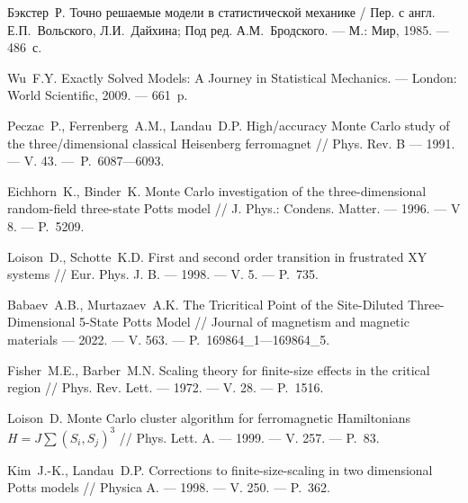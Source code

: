 \begin{thebibliography}{11}
Бэкстер~Р. 
Точно решаемые модели в статистической механике / Пер. с англ. Е.П.~Вольского, Л.И.~Дайхина; Под ред. А.М.~Бродского. 
--- М.: Мир, 1985. 
--- 486~с.





Wu~F.Y. 
Exactly Solved Models: A Journey in Statistical Mechanics. 
--- London: World Scientific, 2009. 
--- 661~p.





\foreignlanguage{english}{%
Peczac~P., Ferrenberg~A.M., Landau~D.P. 
High\-/accuracy Monte Carlo study of the three\-/dimensional classical Heisenberg ferromagnet // Phys. Rev. B 
--- 1991. 
--- V. 43. 
---~P.~6087---6093.
}%

Eichhorn~K., Binder~K. 
Monte Carlo investigation of the three-dimensional random-field three-state Potts model 
// 
J. Phys.: Condens. Matter.
--- 1996. 
--- V 8. 
--- P.~5209.





Loison~D., Schotte~K.D. 
First and second order transition in frustrated XY systems 
// 
Eur. Phys. J. B. 
--- 1998. 
--- V. 5. 
--- P.~735.





Babaev~A.B., Murtazaev~A.K. 
The Tricritical Point of the Site-Diluted Three-Dimensional 5-State Potts Model // Journal of magnetism and magnetic materials 
--- 2022. 
--- V. 563. 
--- P.~169864\_1---169864\_5.





Fisher~M.E., Barber~M.N. 
Scaling theory for finite-size effects in the critical region 
// 
Phys. Rev. Lett. 
--- 1972. 
--- V. 28. 
--- P.~1516.





Loison~D. 
Monte Carlo cluster algorithm for ferromagnetic Hamiltonians $H = J\sum(S_i, S_j)^3$ 
// 
Phys. Lett. A. 
--- 1999. 
--- V. 257. 
--- P.~83.





Kim~J.-K., Landau~D.P. 
Corrections to finite-size-scaling in two dimensional Potts models 
// 
Physica A. 
--- 1998. 
--- V. 250. 
--- P.~362.


\end{thebibliography} 